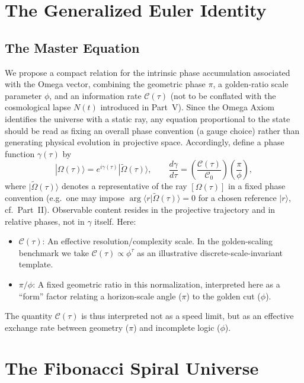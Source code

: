 \section{The Generalized Euler Identity}
\label{chap:euler_identity}

\subsection{The Master Equation}
We propose a compact relation for the intrinsic phase accumulation associated with the Omega vector, combining the geometric phase $\pi$, a golden-ratio scale parameter $\phi$, and an information rate $\mathcal{C}(\tau)$ (not to be conflated with the cosmological lapse $N(t)$ introduced in Part~V). Since the Omega Axiom identifies the universe with a static ray, any equation proportional to the state should be read as fixing an overall phase convention (a gauge choice) rather than generating physical evolution in projective space. Accordingly, define a phase function $\gamma(\tau)$ by
\begin{equation}
    |\Omega(\tau)\rangle = e^{i\gamma(\tau)}|\widetilde{\Omega}(\tau)\rangle,
    \qquad
    \frac{d\gamma}{d\tau} = \left( \frac{\mathcal{C}(\tau)}{\mathcal{C}_0} \right)\left( \frac{\pi}{\phi} \right),
\end{equation}
where $|\widetilde{\Omega}(\tau)\rangle$ denotes a representative of the ray $[\Omega(\tau)]$ in a fixed phase convention (e.g.\ one may impose $\arg\langle r|\widetilde{\Omega}(\tau)\rangle=0$ for a chosen reference $|r\rangle$, cf.\ Part~II). Observable content resides in the projective trajectory and in relative phases, not in $\gamma$ itself.
Here:
\begin{itemize}
    \item $\mathcal{C}(\tau)$: An effective resolution/complexity scale. In the golden-scaling benchmark we take $\mathcal{C}(\tau)\propto \phi^\tau$ as an illustrative discrete-scale-invariant template.
    \item $\pi / \phi$: A fixed geometric ratio in this normalization, interpreted here as a ``form'' factor relating a horizon-scale angle ($\pi$) to the golden cut ($\phi$).
\end{itemize}
The quantity $\mathcal{C}(\tau)$ is thus interpreted not as a speed limit, but as an effective exchange rate between geometry ($\pi$) and incomplete logic ($\phi$).

\section{The Fibonacci Spiral Universe}
\label{chap:spiral_universe}


